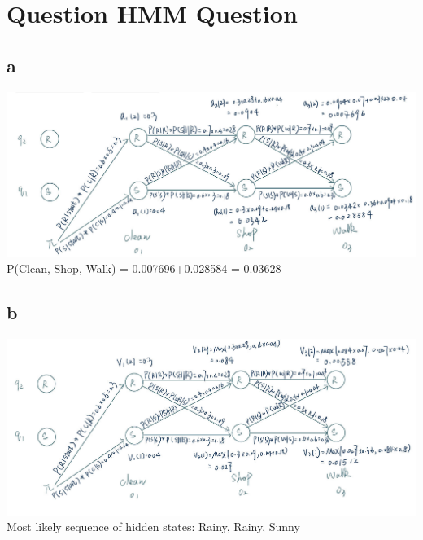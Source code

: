 \documentclass[letterpaper, 12pt]{artikel3}
\begin{document}
\section*{Question HMM Question}
\subsection*{a}
\includegraphics[scale=0.3]{a1.jpg}
P(Clean, Shop, Walk) = 0.007696+0.028584 = 0.03628
\subsection*{b}
\includegraphics[scale=0.3]{a2.jpg}
Most likely sequence of hidden states: Rainy, Rainy, Sunny
\end{document}
